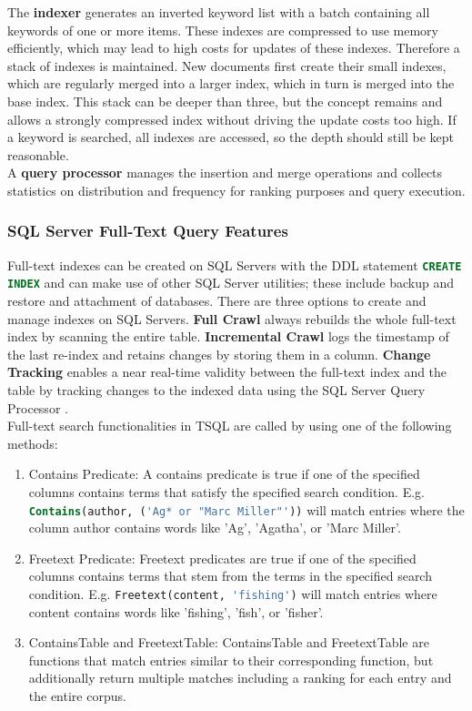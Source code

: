 The \textbf{indexer} generates an inverted keyword list with a batch containing all keywords of one or more items. These indexes are compressed to use memory efficiently, which may lead to high costs for updates of these indexes. Therefore a stack of indexes is maintained. New documents first create their small indexes, which are regularly merged into a larger index, which in turn is merged into the base index. This stack can be deeper than three, but the concept remains and allows a strongly compressed index without driving the update costs too high. If a keyword is searched, all indexes are accessed, so the depth should still be kept reasonable.\\
A \textbf{query processor} manages the insertion and merge operations and collects statistics on distribution and frequency for ranking purposes and query execution.
\subsubsection{SQL Server Full-Text Query Features}
Full-text indexes can be created on \ac{SQL} Servers with the \ac{DDL} statement \lstinline[language=SQL]$CREATE INDEX$ and can make use of other \ac{SQL} Server utilities; these include backup and restore and attachment of databases. There are three options to create and manage indexes on \ac{SQL} Servers. \textbf{Full Crawl} always rebuilds the whole full-text index by scanning the entire table. \textbf{Incremental Crawl} logs the timestamp of the last re-index and retains changes by storing them in a column. \textbf{Change Tracking} enables a near real-time validity between the full-text index and the table by tracking changes to the indexed data using the \ac{SQL} Server Query Processor \parencite[cf.][p. 9]{hamilton_microsoft_2001}.\\
Full-text search functionalities in \ac{TSQL} are called by using one of the following methods: \parencite[cf.][p. 9]{hamilton_microsoft_2001}
\begin{enumerate}
    \item Contains Predicate: A contains predicate is true if one of the specified columns contains terms that satisfy the specified search condition. E.g. \lstinline[language=SQL]$Contains(author, ('Ag* or "Marc Miller"'))$ will match entries where the column author contains words like 'Ag', 'Agatha', or 'Marc Miller'.
    \item Freetext Predicate: Freetext predicates are true if one of the specified columns contains terms that stem from the terms in the specified search condition. E.g. \lstinline[language=SQL]$Freetext(content, 'fishing')$ will match entries where content contains words like 'fishing', 'fish', or 'fisher'.
    \item ContainsTable and FreetextTable: ContainsTable and FreetextTable are functions that match entries similar to their corresponding function, but additionally return multiple matches including a ranking for each entry and the entire corpus.
\end{enumerate}
